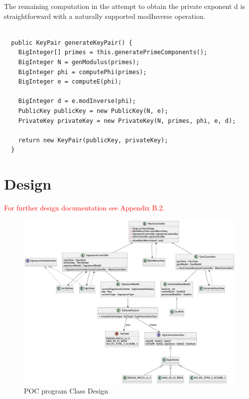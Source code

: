 \documentclass[]{final_report}
\theoremstyle{definition}
\begin{document}
The remaining computation in the attempt to obtain the private exponent d is straightforward with a naturally supported modInverse operation.
\begin{lstlisting}[caption=Java Implementation of Key Generation (\ref{subSec:keygen})]
  
  public KeyPair generateKeyPair() {
    BigInteger[] primes = this.generatePrimeComponents();
    BigInteger N = genModulus(primes);
    BigInteger phi = computePhi(primes);
    BigInteger e = computeE(phi);
    
    BigInteger d = e.modInverse(phi);
    PublicKey publicKey = new PublicKey(N, e);
    PrivateKey privateKey = new PrivateKey(N, primes, phi, e, d);

    return new KeyPair(publicKey, privateKey);
  }

\end{lstlisting}

\section{Design}
\textcolor{red} {For further design documentation see Appendix B.2.}

\begin{figure}[H]
    \centering
    \includegraphics[width=\textwidth]{poc_pictures/POC.png}
    \caption{POC program Class Design}
    \label{fig:POCCLASSES}
\end{figure}
\end{document}
